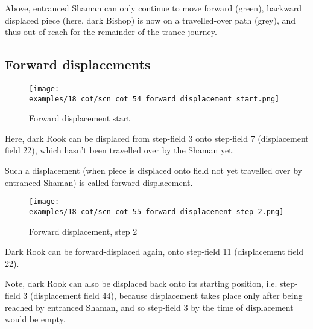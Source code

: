 Above, entranced Shaman can only continue to move forward (green), backward
displaced piece (here, dark Bishop) is now on a travelled-over path (grey),
and thus out of reach for the remainder of the trance-journey.

\clearpage %

\subsection*{Forward displacements}
\label{sec:Conquest of Tlalocan/Trance-journey/Forward displacements}

\vspace*{-1.0\baselineskip}
\noindent
\begin{figure}[!h]
\texttt{[image: examples/18\_cot/scn\_cot\_54\_forward\_displacement\_start.png]}
\caption{Forward displacement start}
\label{fig:scn_cot_54_forward_displacement_start}
\end{figure}

Here, dark Rook can be displaced from step-field 3 onto step-field 7 (displacement
field 22), which hasn't been travelled over by the Shaman yet.

Such a displacement (when piece is displaced onto field not yet travelled over by
entranced Shaman) is called forward displacement.

\clearpage %

\noindent
\begin{figure}[!h]
\texttt{[image: examples/18\_cot/scn\_cot\_55\_forward\_displacement\_step\_2.png]}
\caption{Forward displacement, step 2}
\label{fig:scn_cot_55_forward_displacement_step_2}
\end{figure}

Dark Rook can be forward-displaced again, onto step-field 11 (displacement field 22).

Note, dark Rook can also be displaced back onto its starting position, i.e. step-field
3 (displacement field 44), because displacement takes place only after being reached
by entranced Shaman, and so step-field 3 by the time of displacement would be empty.

\clearpage %

